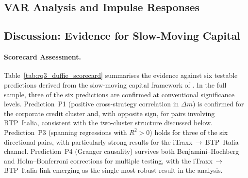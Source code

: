 \subsection{VAR Analysis and Impulse Responses}
\label{sec:rq3_var}

%
%
%
%


\subsection{Discussion: Evidence for Slow-Moving Capital}
\label{sec:rq3_discussion}

%
%
\paragraph{Scorecard Assessment.}
Table~\ref{tab:rq3_duffie_scorecard} summarises the evidence against six
testable predictions derived from the slow-moving capital framework of
\citet{duffie2010presidential}.  In the full sample, three of the six
predictions are confirmed at conventional significance levels.  Prediction~P1
(positive cross-strategy correlation in $\Delta m$) is confirmed for the
corporate credit cluster and, with opposite sign, for pairs involving
BTP~Italia, consistent with the two-cluster structure discussed below.
Prediction~P3 (spanning regressions with $R^{2}>0$) holds for three of the
six directional pairs, with particularly strong results for the
iTraxx$\,\to\,$BTP~Italia channel.  Prediction~P4 (Granger causality)
survives both Benjamini--Hochberg and Holm--Bonferroni corrections for
multiple testing, with the iTraxx$\,\to\,$BTP~Italia link emerging as the
single most robust result in the analysis.

